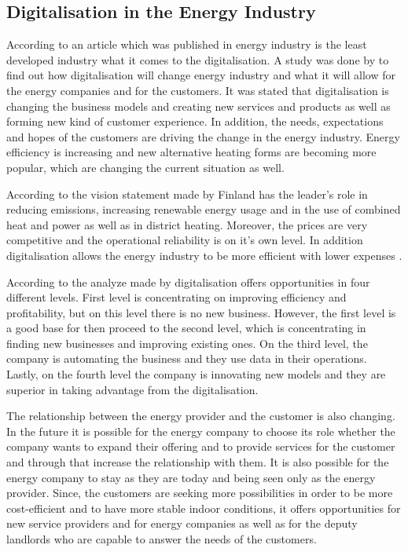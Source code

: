 \subsection{Digitalisation in the Energy Industry}

According to an article which was published in \parencite{Energiauutiset:2016} energy industry is the least developed industry what it comes to the digitalisation. A study was done by \textcite{Deloitte} to find out how digitalisation will change energy industry and what it will allow for the energy companies and for the customers. It was stated that digitalisation is changing the business models and creating new services and products as well as forming new kind of customer experience. In addition, the needs, expectations and hopes of the customers are driving the change in the energy industry. Energy efficiency is increasing and new alternative heating forms are becoming more popular, which are changing the current situation as well. \parencite{Energiateollisuus:2018}

According to the vision statement made by \textcite{Energiateollisuus:2018} Finland has the leader's role in reducing emissions, increasing renewable energy usage and in the use of combined heat and power as well as in district heating. Moreover, the prices are very competitive and the operational reliability is on it's own level. In addition digitalisation allows the energy industry to be more efficient with lower expenses \parencite{Tekes:2017}.

According to the analyze made by \textcite{Deloitte} digitalisation offers opportunities in four different levels. First level is concentrating on improving efficiency and profitability, but on this level there is no new business. However, the first level is a good base for then proceed to the second level, which is concentrating in finding new businesses and improving existing ones. On the third level, the company is automating the business and they use data in their operations. Lastly, on the fourth level the company is innovating new models and they are superior in taking advantage from the digitalisation.

The relationship between the energy provider and the customer is also changing. In the future it is possible for the energy company to choose its role whether the company wants to expand their offering and to provide services for the customer and through that increase the relationship with them. It is also possible for the energy company to stay as they are today and being seen only as the energy provider. Since, the customers are seeking more possibilities in order to be more cost-efficient and to have more stable indoor conditions, it offers opportunities for new service providers and for energy companies as well as for the deputy landlords who are capable to answer the needs of the customers. \parencite{Deloitte} 

